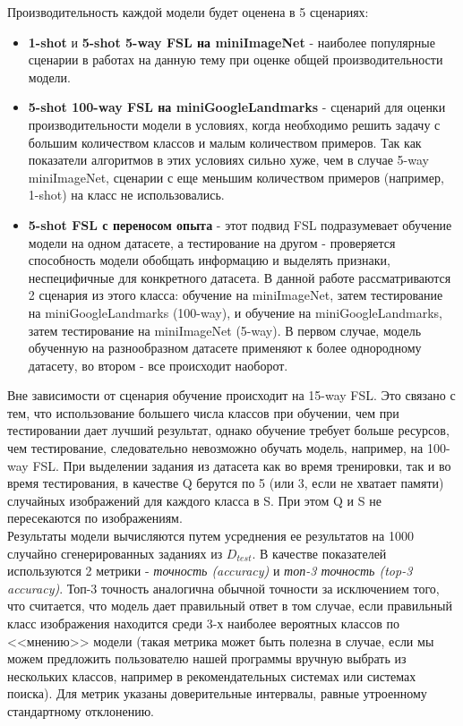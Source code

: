 \documentclass[a4paper, 12pt]{report}
\begin{document}
Производительность каждой модели будет оценена в 5 сценариях:
\begin{itemize}
\item \textbf{1-shot} и \textbf{5-shot 5-way FSL на miniImageNet} - наиболее популярные сценарии в работах на данную тему при оценке общей производительности модели.

\item \textbf{5-shot 100-way FSL на miniGoogleLandmarks} - сценарий для оценки производительности модели в условиях, когда необходимо решить задачу с большим количеством классов и малым количеством примеров. Так как показатели алгоритмов в этих условиях сильно хуже, чем в случае 5-way miniImageNet, сценарии с еще меньшим количеством примеров (например, 1-shot) на класс не использовались.

\item \textbf{5-shot FSL с переносом опыта} - этот подвид FSL подразумевает обучение модели на одном датасете, а тестирование на другом - проверяется способность модели обобщать информацию и выделять признаки, неспецифичные для конкретного датасета. В данной работе рассматриваются 2 сценария из этого класса: обучение на miniImageNet, затем тестирование на miniGoogleLandmarks (100-way), и обучение на miniGoogleLandmarks, затем тестирование на miniImageNet (5-way). В первом случае, модель обученную на разнообразном датасете применяют к более однородному датасету, во втором - все происходит наоборот.

\end{itemize}

Вне зависимости от сценария обучение происходит на 15-way FSL. Это связано с тем, что использование большего числа классов при обучении, чем при тестировании дает лучший результат, однако обучение требует больше ресурсов, чем тестирование, следовательно невозможно обучать модель, например, на 100-way FSL. При выделении задания из датасета как во время тренировки, так и во время тестирования, в качестве Q берутся по 5 (или 3, если не хватает памяти) случайных изображений для каждого класса в S. При этом Q и S не пересекаются по изображениям. \\

Результаты модели вычисляются путем усреднения ее результатов на 1000 случайно сгенерированных заданиях из $D_{test}$. В качестве показателей используются 2 метрики - \textit{точность (accuracy)} и \textit{топ-3 точность (top-3 accuracy)}. Топ-3 точность аналогична обычной точности за исключением того, что считается, что модель дает правильный ответ в том случае, если правильный класс изображения находится среди 3-х наиболее вероятных классов по <<мнению>> модели (такая метрика может быть полезна в случае, если мы можем предложить пользователю нашей программы вручную выбрать из нескольких классов, например в рекомендательных системах или системах поиска). Для метрик указаны доверительные интервалы, равные утроенному стандартному отклонению. \\
\end{document}
